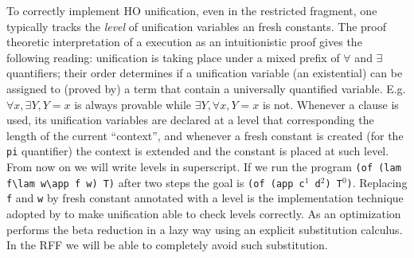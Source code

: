 \documentclass{llncs}
\begin{document}
To correctly implement HO unification, even in the restricted \Ll{} fragment,
one typically tracks the \emph{level} of unification variables an fresh constants.  The proof theoretic interpretation of a \lp{} execution as an intuitionistic proof gives the following reading: unification is taking place under
a mixed prefix of $\forall$ and $\exists$ quantifiers; their order
determines if a unification variable (an existential) can be assigned to
(proved by) a term that contain a universally quantified variable.
E.g. $\forall x,\exists Y, Y = x$ is always provable while
$\exists Y,\forall x, Y = x$ is not.
Whenever a clause is used, its unification variables are declared at
a level that corresponding the length of the current ``context'', and whenever
a fresh constant is created (for the \verb+pi+ quantifier) the context
is extended and the constant is placed at such level.  From now on we will
write levels in superscript.  If we run the program
\verb+(of (lam f\lam w\app f w) T)+ after two steps the goal is
\verb+(of (app c+$^1$\verb+ d+$^2$\verb+) T+$^0$\verb+)+.
Replacing \verb+f+ and \verb+w+ by fresh constant annotated with a level is the
implementation technique adopted by \tedius{} to make unification able to
check levels correctly.  As an optimization \tedius{} performs the beta
reduction in a lazy way using an explicit substitution calculus.  In the RFF we
will be able to completely avoid such substitution.
\end{document}

